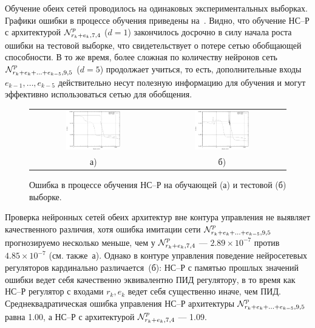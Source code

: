 Обучение обеих сетей проводилось на одинаковых экспериментальных
выборках.  Графики ошибки в процессе обучения приведены
на~.  Видно, что обучение НС--Р
с архитектурой $\mathcal{N}^p_{r_k+e_k,7,4}$ ($d=1$) закончилось досрочно в
силу начала роста ошибки на тестовой выборке, что свидетельствует о
потере сетью обобщающей способности.  В то же время, более сложная по
количеству нейронов сеть $\mathcal{N}^p_{r_k+e_k+\ldots+e_{k-5},9,5}$ ($d=5$)
продолжает учиться, то есть, дополнительные входы
$e_{k-1},\ldots,e_{k-5}$ действительно несут полезную информацию для
обучения и могут эффективно использоваться сетью для обобщения.

\begin{figure}[h]
  \centering
  \begin{tabular}{cc}
    \includegraphics[width=0.45\textwidth,%
      totalheight=0.25\textheight]{cstr_e5r1_vs_e1r1_training_learn_rus}
    &
    \includegraphics[width=0.45\textwidth,%
      totalheight=0.25\textheight]{cstr_e5r1_vs_e1r1_training_test_rus} \\
    а) & б)
  \end{tabular}
  \caption{Ошибка в процессе обучения НС--Р на обучающей (а) и тестовой (б) выборке.}%
  \label{fig:cstr_e5r1_vs_e1r1_training}
\end{figure}

Проверка нейронных сетей обеих архитектур вне контура управления не
выявляет качественного различия, хотя ошибка имитации сети
$\mathcal{N}^p_{r_k+e_k+\ldots+e_{k-5},9,5}$ прогнозируемо несколько меньше,
чем у $\mathcal{N}^p_{r_k+e_k,7,4}$ --- $2.89\times 10^{-7}$ против $4.85\times
10^{-7}$ (см. также~а).  Однако в
контуре управления поведение нейросетевых регуляторов кардинально
различается~(б): НС--Р с памятью
прошлых значений ошибки ведет себя качественно эквивалентно ПИД
регулятору, в то время как НС--Р регулятор с входами $r_k,e_k$ ведет
себя существенно иначе, чем ПИД.  Среднеквадратическая ошибка
управления НС--Р архитектуры $\mathcal{N}^p_{r_k+e_k+\ldots+e_{k-5},9,5}$
равна 1.00, а НС--Р с архитектурой $\mathcal{N}^p_{r_k+e_k,7,4}$ --- 1.09.

